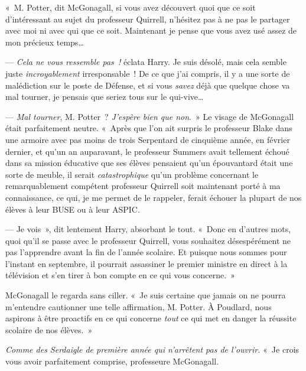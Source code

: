 «~M. Potter, dit McGonagall, si vous avez découvert quoi que ce soit d'intéressant au sujet du professeur Quirrell, n'hésitez pas à ne pas le partager avec moi ni avec qui que ce soit.
Maintenant je pense que vous avez usé assez de mon précieux temps…

--- \emph{Cela ne vous ressemble pas~!} éclata Harry.
Je suis désolé, mais cela semble juste \emph{incroyablement} irresponsable~!
De ce que j'ai compris, il y a une sorte de malédiction sur le poste de Défense, et si vous \emph{savez} déjà que quelque chose va mal tourner, je pensais que seriez tous sur le qui-vive…

--- \emph{Mal tourner}, M. Potter~?
\emph{J'espère bien que non}.~»
Le visage de McGonagall était parfaitement neutre.
«~Après que l'on ait surpris le professeur Blake dans une armoire avec pas moins de trois Serpentard de cinquième année, en février dernier, et qu'un an auparavant, le professeur Summers avait tellement échoué dans sa mission éducative que ses élèves pensaient qu'un épouvantard était une sorte de meuble, il serait \emph{catastrophique} qu'un problème concernant le remarquablement compétent professeur Quirrell soit maintenant porté à ma connaissance, ce qui, je me permet de le rappeler, ferait échouer la plupart de nos élèves à leur BUSE ou à leur ASPIC.

--- Je vois~», dit lentement Harry, absorbant le tout.
«~Donc en d'autres mots, quoi qu'il se passe avec le professeur Quirrell, vous souhaitez désespérément ne pas l'apprendre avant la fin de l'année scolaire.
Et puisque nous sommes pour l'instant en septembre, il pourrait assassiner le premier ministre en direct à la télévision et s'en tirer à bon compte en ce qui vous concerne.~»

McGonagall le regarda sans ciller.
«~Je suis certaine que jamais on ne pourra m'entendre cautionner une telle affirmation, M. Potter.
À Poudlard, nous aspirons à être proactifs en ce qui concerne \emph{tout} ce qui met en danger la réussite scolaire de nos élèves.~»

\emph{Comme des Serdaigle de première année qui n'arrêtent pas de l'ouvrir.}
«~Je crois vous avoir parfaitement comprise, professeure McGonagall.


